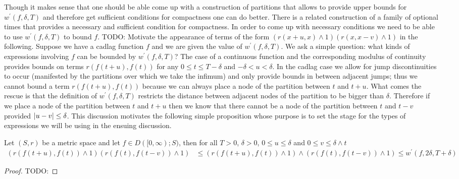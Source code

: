 Though it makes sense that one should be able come up with a construction of partitions that allows to provide upper bounds for $w^\prime(f, \delta, T)$ and therefore get sufficient conditions for compactness one can do better.  There is a related construction of a family of optional times that provides a necessary and sufficient condition for compactness.  In order to come up with necessary conditions we need to be able to use $w^{\prime}(f, \delta, T)$ to bound $f$.
TODO: Motivate the appearance of terms of the form $(r(x+u,x) \wedge 1)(r(x, x-v) \wedge 1)$ in the following.  Suppose we have a cadlag function $f$ and we are given the 
value of $w^{\prime}(f, \delta, T)$.  We ask a simple question: what kinds of expressions involving $f$ can be bounded by $w^{\prime}(f, \delta, T)$?  The case of a continuous 
function and the corresponding modulus of continuity provides bounds on terms $r(f(t+u), f(t))$ for any $0 \leq t \leq T-\delta$ and $-\delta < u < \delta$.  In the cadlag case we allow
for jump discontinuities to occur (manifested by the partitions over which we take the infimum) and only provide bounds in between adjacent jumps; 
thus we cannot bound a term $r(f(t+u), f(t))$ because we can always place a node of the partition between $t$ and $t+u$.  What comes the rescue is that the definition
of $w^{\prime}(f, \delta, T)$ restricts the distance between adjacent nodes of the partition to be bigger than $\delta$.  Therefore if we place a node of the partition between $t$ and $t+u$ then we know that there cannot be a node of the partition between $t$ and $t-v$ provided $\left \vert u-v \right \vert \leq \delta$.  This discussion motivates the following 
simple proposition whose purpose is to set the stage for the types of expressions we will be using in the ensuing discussion.

\begin{prop}\label{SkorohodInfiniteModulusOfContinuityBound}Let $(S,r)$ be a metric space and let $f \in D([0,\infty); S)$, then for all $T>0$, $\delta >0$, $0 \leq u \leq \delta$ and $0 \leq v \leq \delta \wedge t$
\begin{align*}
(r(f(t+u), f(t)) \wedge 1) (r(f(t), f(t-v)) \wedge 1) &\leq (r(f(t+u), f(t)) \wedge 1)  \wedge (r(f(t), f(t-v)) \wedge 1) \leq w^{\prime}(f, 2\delta, T+\delta)
\end{align*}
\end{prop}
\begin{proof}
TODO:
\end{proof}

